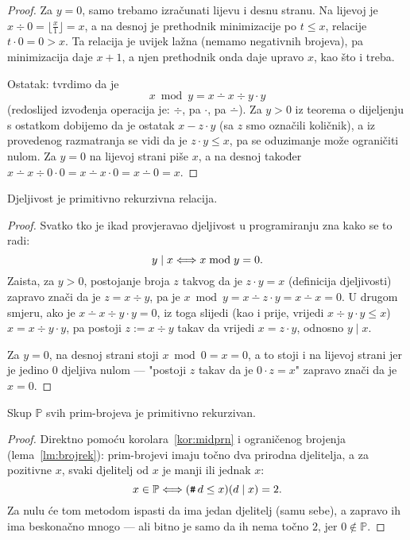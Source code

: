\begin{proof}
Za $y=0$, samo trebamo izračunati lijevu i desnu stranu. Na lijevoj je $x\div 0=\bigl\lfloor\frac{x}{1}\bigr\rfloor=x$, a na desnoj je prethodnik minimizacije po $t\le x$, relacije $t\cdot 0=0>x$. Ta relacija je uvijek lažna (nemamo negativnih brojeva), pa minimizacija daje $x+1$, a njen prethodnik onda daje upravo $x$, kao što i treba.

Ostatak: tvrdimo da je
\begin{equation}
    x\bmod y=x\dotminus x\div y\cdot y
\end{equation}
(redoslijed izvođenja operacija je: $\div$, pa $\cdot$, pa $\dotminus$). Za $y>0$ iz teorema o dijeljenju s ostatkom dobijemo da je ostatak $x-z\cdot y$ (sa $z$ smo označili količnik), a iz provedenog razmatranja se vidi da je $z\cdot y\le x$, pa se oduzimanje može ograničiti nulom. Za $y=0$ na lijevoj strani piše $x$, a na desnoj također $x\dotminus x\div0\cdot 0=x\dotminus x\cdot0=x\dotminus0=x$.
\end{proof}

\begin{korolar}[{name=[primitivna rekurzivnost djeljivosti]}]\label{kor:midprn}
Djeljivost je primitivno rekurzivna relacija.
\end{korolar}
\begin{proof}
Svatko tko je ikad provjeravao djeljivost u programiranju zna kako se to radi:
\begin{equation}
    y\mid x\Longleftrightarrow x\bmod y=0\text.
\end{equation}
Zaista, za $y>0$, postojanje broja $z$ takvog da je $z\cdot y=x$ (definicija djeljivosti) zapravo znači da je $z=x\div y$, pa je $x\bmod y=x\dotminus z\cdot y=x\dotminus x=0$. U drugom smjeru, ako je $x\dotminus x\div y\cdot y=0$, iz toga slijedi (kao i prije, vrijedi $x\div y\cdot y\le x$) $x=x\div y\cdot y$, pa postoji $z:=x\div y$ takav da vrijedi $x=z\cdot y$, odnosno $y\mid x$.

Za $y=0$, na desnoj strani stoji $x\bmod 0=x=0$, a to stoji i na lijevoj strani jer je jedino $0$ djeljiva nulom --- "postoji $z$ takav da je $0\cdot z=x$" zapravo znači da je $x=0$.
\end{proof}

\begin{korolar}[{name=[primitivna rekurzivnost skupa svih prim-brojeva]}]
    Skup $\mathbb P$ svih prim-brojeva je primitivno rekurzivan.
\end{korolar}
\begin{proof}
Direktno pomoću korolara~\ref{kor:midprn} i ograničenog brojenja (lema~\ref{lm:brojrek}): prim-brojevi imaju točno dva prirodna djelitelja, a za pozitivne $x$, svaki djelitelj od $x$ je manji ili jednak $x$:
\begin{equation}\label{eq:Pprn}
    x\in\mathbb P\Longleftrightarrow(\texttt{\textup{\#}}\, d\le x)(d\mid x)=2\text.
\end{equation}
Za nulu će tom metodom ispasti da ima jedan djelitelj (samu sebe), a zapravo ih ima beskonačno mnogo --- ali bitno je samo da ih nema točno $2$, jer $0\notin\mathbb P$.
\end{proof}

